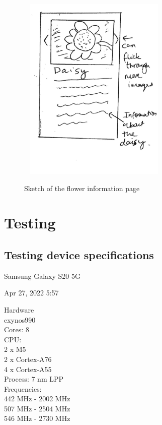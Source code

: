 \documentclass[12pt,a4paper]{report}
\begin{document}
\begin{figure}[h]\
    \centering
    \includegraphics[width=0.6\textwidth]{Info_Sketch.jpg}
    \caption{Sketch of the flower information page}
    \label{fig:sketch_info}
\end{figure}

\section{Testing}
\subsection{Testing device specifications}

\label{subsec:phone_spec}

Samsung Galaxy S20 5G

\par

Apr 27, 2022 5:57

\par

Hardware \\
exynos990 \\
Cores: 8 \\
CPU: \\
2 x M5 \\
2 x Cortex-A76 \\
4 x Cortex-A55 \\
Process: 7 nm LPP \\
Frequencies: \\
442 MHz - 2002 MHz \\
507 MHz - 2504 MHz \\ 
546 MHz - 2730 MHz
\end{document}
